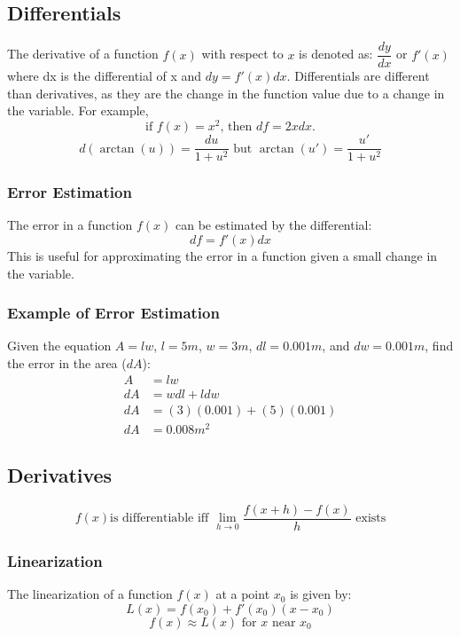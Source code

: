 \documentclass[a4paper,12pt,openany]{book}
\begin{document}
\subsection{Differentials}
The derivative of a function \(f(x)\) with respect to \(x\) is denoted as: $\dfrac{dy}{dx}$ or $f'(x)$ where dx is the differential of x and $dy = f'(x)dx$.
Differentials are different than derivatives, as they are the change in the function value due to a change in the variable. For example,
\[
\text{if }f(x) = x^2\text{, then } df = 2xdx\text{.}
\]
\[
d(\arctan(u)) = \dfrac{du}{1+u^2}\text{ but }\arctan(u') = \dfrac{u'}{1+u^2}
\]

\subsubsection{Error Estimation}
The error in a function \(f(x)\) can be estimated by the differential:
\begin{equation}\label{Error Estimation}
    df = f'(x)dx
\end{equation}
This is useful for approximating the error in a function given a small change in the variable.

\subsubsection{Example of Error Estimation}
Given the equation $A = lw$, $l = 5m$, $w = 3m$, $dl = 0.001m$, and $dw = 0.001m$, find the error in the area ($dA$): 
\begin{align*}
    A &= lw\\
    dA &= wdl + ldw\\
    dA &= (3)(0.001) + (5)(0.001)\\
    dA &= 0.008m^2
\end{align*}
\subsection{Derivatives}

\[
    f(x) \text{is differentiable iff } \lim_{h \to 0} \dfrac{f(x+h) - f(x)}{h} \text{ exists}
\]
\subsubsection{Linearization}
The linearization of a function \(f(x)\) at a point \(x_0\) is given by:
\begin{equation}\label{Linearization}
    L(x) = f(x_0) + f'(x_0)(x-x_0)
\end{equation}
\[
    f(x) \approx L(x) \text{ for } x \text{ near } x_0
\]
\end{document}
